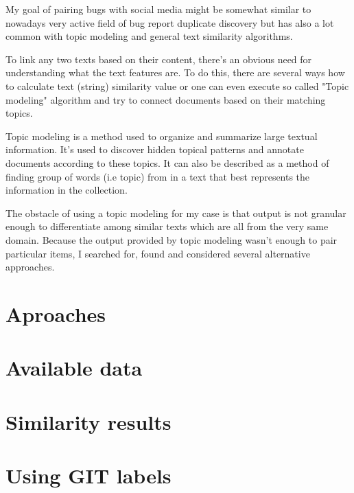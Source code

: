 My goal of pairing bugs with social media might be somewhat similar to nowadays very active field of bug report duplicate discovery but has also a lot common with topic modeling and general text similarity algorithms.

To link any two texts based on their content, there's an obvious need for understanding what the text features are. 
To do this, there are several ways how to calculate text (string) similarity value or one can even execute so called "Topic modeling" algorithm and try to connect documents based on their matching topics.

Topic modeling is a method used to organize and summarize large textual information. It's used to discover hidden topical patterns and annotate documents according to these topics. It can also be described as a method of finding group of words (i.e topic) from in a text that best represents the information in the collection.

The obstacle of using a topic modeling for my case is that output is not granular enough to differentiate among similar texts which are all from the very same domain. Because the output provided by topic modeling wasn't enough to pair particular items, I searched for, found and considered several alternative approaches.

\section{Aproaches}


\section{Available data}


\section{Similarity results}


\section{Using GIT labels}

